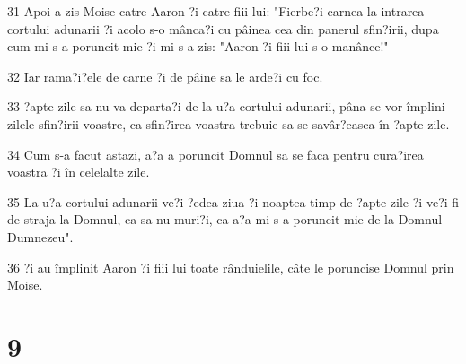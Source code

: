 \par 31 Apoi a zis Moise catre Aaron ?i catre fiii lui: "Fierbe?i carnea la intrarea cortului adunarii ?i acolo s-o mânca?i cu pâinea cea din panerul sfin?irii, dupa cum mi s-a poruncit mie ?i mi s-a zis: "Aaron ?i fiii lui s-o manânce!"
\par 32 Iar rama?i?ele de carne ?i de pâine sa le arde?i cu foc.
\par 33 ?apte zile sa nu va departa?i de la u?a cortului adunarii, pâna se vor împlini zilele sfin?irii voastre, ca sfin?irea voastra trebuie sa se savâr?easca în ?apte zile.
\par 34 Cum s-a facut astazi, a?a a poruncit Domnul sa se faca pentru cura?irea voastra ?i în celelalte zile.
\par 35 La u?a cortului adunarii ve?i ?edea ziua ?i noaptea timp de ?apte zile ?i ve?i fi de straja la Domnul, ca sa nu muri?i, ca a?a mi s-a poruncit mie de la Domnul Dumnezeu".
\par 36 ?i au împlinit Aaron ?i fiii lui toate rânduielile, câte le poruncise Domnul prin Moise.

\chapter{9}

